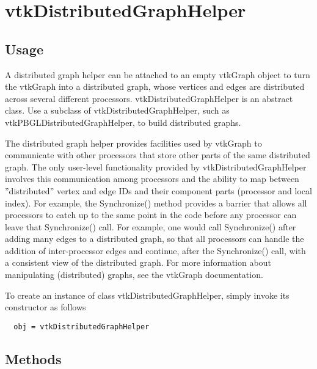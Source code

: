 \section{vtkDistributedGraphHelper}

\subsection{Usage}

 A distributed graph helper can be attached to an empty vtkGraph
 object to turn the vtkGraph into a distributed graph, whose
 vertices and edges are distributed across several different
 processors. vtkDistributedGraphHelper is an abstract class. Use a
 subclass of vtkDistributedGraphHelper, such as
 vtkPBGLDistributedGraphHelper, to build distributed graphs.

 The distributed graph helper provides facilities used by vtkGraph
 to communicate with other processors that store other parts of the
 same distributed graph. The only user-level functionality provided
 by vtkDistributedGraphHelper involves this communication among
 processors and the ability to map between ''distributed'' vertex and
 edge IDs and their component parts (processor and local index). For
 example, the Synchronize() method provides a barrier that allows
 all processors to catch up to the same point in the code before any
 processor can leave that Synchronize() call. For example, one would
 call Synchronize() after adding many edges to a distributed graph,
 so that all processors can handle the addition of inter-processor
 edges and continue, after the Synchronize() call, with a consistent
 view of the distributed graph. For more information about
 manipulating (distributed) graphs, see the vtkGraph documentation.


To create an instance of class vtkDistributedGraphHelper, simply
invoke its constructor as follows
\begin{verbatim}
  obj = vtkDistributedGraphHelper
\end{verbatim}
\subsection{Methods}

